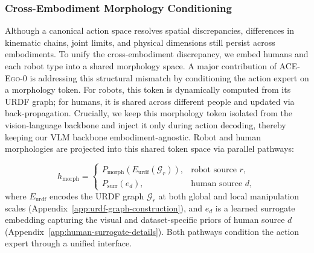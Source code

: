 \documentclass{article}
\newcommand{\OURS}{\textsc{ACE-Ego-0}\xspace}
\newcommand{\Ours}{\OURS}
\begin{document}
\subsubsection{Cross-Embodiment Morphology Conditioning}
\label{sec:urdf-conditioning}

Although a canonical action space resolves spatial discrepancies, differences in kinematic chains, joint limits, and physical dimensions still persist across embodiments. To unify the cross-embodiment discrepancy, we embed humans and each robot type into a shared morphology space. A major contribution of \Ours is addressing this structural mismatch by conditioning the action expert on a morphology token. For robots, this token is dynamically computed from its URDF graph; for humans, it is shared across different people and updated via back-propagation. Crucially, we keep this morphology token isolated from the vision-language backbone and inject it only during action decoding, thereby keeping our VLM backbone embodiment-agnostic.
Robot and human morphologies are projected into this shared token space via parallel pathways:

\begin{equation}
  h_{\mathrm{morph}}
  =
  \begin{cases}
  P_{\mathrm{morph}}\!\left(E_{\mathrm{urdf}}(\mathcal{G}_{r})\right),
    & \text{robot source } r, \\[4pt]
  P_{\mathrm{surr}}(e_{d}),
    & \text{human source } d,
  \end{cases}
  \label{eq:morph-token}
\end{equation}
where $E_{\mathrm{urdf}}$ encodes the URDF graph $\mathcal{G}_r$ at both global and local manipulation scales (Appendix~\ref{app:urdf-graph-construction}), and $e_d$ is a learned surrogate embedding capturing the visual and dataset-specific priors of human source $d$ (Appendix~\ref{app:human-surrogate-details}). Both pathways condition the action expert through a unified interface.


\end{document}
